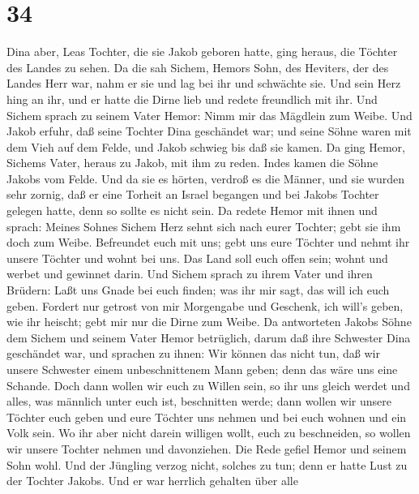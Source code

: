 \hypertarget{section-33}{%
\section{34}\label{section-33}}

 Dina aber, Leas Tochter, die sie Jakob geboren hatte, ging
heraus, die Töchter des Landes zu sehen.  Da die sah Sichem,
Hemors Sohn, des Heviters, der des Landes Herr war, nahm er sie und lag
bei ihr und schwächte sie.  Und sein Herz hing an ihr, und
er hatte die Dirne lieb und redete freundlich mit ihr.  Und
Sichem sprach zu seinem Vater Hemor: Nimm mir das Mägdlein zum Weibe.
 Und Jakob erfuhr, daß seine Tochter Dina geschändet war;
und seine Söhne waren mit dem Vieh auf dem Felde, und Jakob schwieg bis
daß sie kamen.  Da ging Hemor, Sichems Vater, heraus zu
Jakob, mit ihm zu reden.  Indes kamen die Söhne Jakobs vom
Felde. Und da sie es hörten, verdroß es die Männer, und sie wurden sehr
zornig, daß er eine Torheit an Israel begangen und bei Jakobs Tochter
gelegen hatte, denn so sollte es nicht sein.  Da redete
Hemor mit ihnen und sprach: Meines Sohnes Sichem Herz sehnt sich nach
eurer Tochter; gebt sie ihm doch zum Weibe.  Befreundet euch
mit uns; gebt uns eure Töchter und nehmt ihr unsere Töchter
 und wohnt bei uns. Das Land soll euch offen sein; wohnt
und werbet und gewinnet darin.  Und Sichem sprach zu ihrem
Vater und ihren Brüdern: Laßt uns Gnade bei euch finden; was ihr mir
sagt, das will ich euch geben.  Fordert nur getrost von mir
Morgengabe und Geschenk, ich will's geben, wie ihr heischt; gebt mir nur
die Dirne zum Weibe.  Da antworteten Jakobs Söhne dem
Sichem und seinem Vater Hemor betrüglich, darum daß ihre Schwester Dina
geschändet war,  und sprachen zu ihnen: Wir können das
nicht tun, daß wir unsere Schwester einem unbeschnittenem Mann geben;
denn das wäre uns eine Schande.  Doch dann wollen wir euch
zu Willen sein, so ihr uns gleich werdet und alles, was männlich unter
euch ist, beschnitten werde;  dann wollen wir unsere
Töchter euch geben und eure Töchter uns nehmen und bei euch wohnen und
ein Volk sein.  Wo ihr aber nicht darein willigen wollt,
euch zu beschneiden, so wollen wir unsere Tochter nehmen und
davonziehen.  Die Rede gefiel Hemor und seinem Sohn wohl.
 Und der Jüngling verzog nicht, solches zu tun; denn er
hatte Lust zu der Tochter Jakobs. Und er war herrlich gehalten über alle
